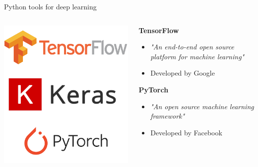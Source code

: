 \documentclass[9pt, aspectratio=169]{beamer}
\begin{document}
\begin{frame}
    {Python tools for deep learning}

    \begin{columns}
        \begin{column}{.3\textwidth}
            \centering
            \includegraphics[width=\textwidth]{tf_keras_pythorch_logo.png}
        \end{column}

        \begin{column}{.7\textwidth}
            \textbf{TensorFlow}
            \begin{itemize}
                \item \textit{"An end-to-end open source platform for machine learning"}
                \item Developed by Google
            \end{itemize}

            \textbf{PyTorch}
            \begin{itemize}
                \item \textit{"An open source machine learning framework"}
                \item Developed by Facebook
            \end{itemize}


\end{column}
\end{columns}
\end{frame}
\end{document}
